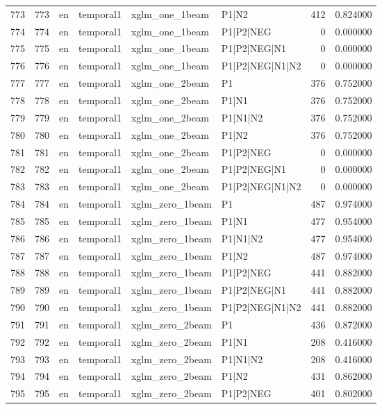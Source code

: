 \begin{tabular}{lrllllrr}
773 & 773 & en & temporal1 & xglm_one_1beam & P1|N2 & 412 & 0.824000 \\
774 & 774 & en & temporal1 & xglm_one_1beam & P1|P2|NEG & 0 & 0.000000 \\
775 & 775 & en & temporal1 & xglm_one_1beam & P1|P2|NEG|N1 & 0 & 0.000000 \\
776 & 776 & en & temporal1 & xglm_one_1beam & P1|P2|NEG|N1|N2 & 0 & 0.000000 \\
777 & 777 & en & temporal1 & xglm_one_2beam & P1 & 376 & 0.752000 \\
778 & 778 & en & temporal1 & xglm_one_2beam & P1|N1 & 376 & 0.752000 \\
779 & 779 & en & temporal1 & xglm_one_2beam & P1|N1|N2 & 376 & 0.752000 \\
780 & 780 & en & temporal1 & xglm_one_2beam & P1|N2 & 376 & 0.752000 \\
781 & 781 & en & temporal1 & xglm_one_2beam & P1|P2|NEG & 0 & 0.000000 \\
782 & 782 & en & temporal1 & xglm_one_2beam & P1|P2|NEG|N1 & 0 & 0.000000 \\
783 & 783 & en & temporal1 & xglm_one_2beam & P1|P2|NEG|N1|N2 & 0 & 0.000000 \\
784 & 784 & en & temporal1 & xglm_zero_1beam & P1 & 487 & 0.974000 \\
785 & 785 & en & temporal1 & xglm_zero_1beam & P1|N1 & 477 & 0.954000 \\
786 & 786 & en & temporal1 & xglm_zero_1beam & P1|N1|N2 & 477 & 0.954000 \\
787 & 787 & en & temporal1 & xglm_zero_1beam & P1|N2 & 487 & 0.974000 \\
788 & 788 & en & temporal1 & xglm_zero_1beam & P1|P2|NEG & 441 & 0.882000 \\
789 & 789 & en & temporal1 & xglm_zero_1beam & P1|P2|NEG|N1 & 441 & 0.882000 \\
790 & 790 & en & temporal1 & xglm_zero_1beam & P1|P2|NEG|N1|N2 & 441 & 0.882000 \\
791 & 791 & en & temporal1 & xglm_zero_2beam & P1 & 436 & 0.872000 \\
792 & 792 & en & temporal1 & xglm_zero_2beam & P1|N1 & 208 & 0.416000 \\
793 & 793 & en & temporal1 & xglm_zero_2beam & P1|N1|N2 & 208 & 0.416000 \\
794 & 794 & en & temporal1 & xglm_zero_2beam & P1|N2 & 431 & 0.862000 \\
795 & 795 & en & temporal1 & xglm_zero_2beam & P1|P2|NEG & 401 & 0.802000 \\

\end{tabular}
